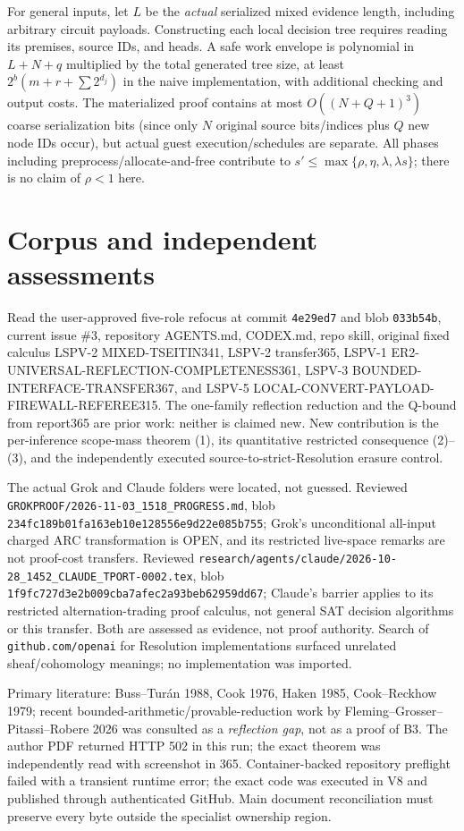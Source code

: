 \documentclass[11pt]{article}
\begin{document}
For general inputs, let $L$ be the \emph{actual} serialized mixed evidence length, including arbitrary circuit payloads. Constructing each local decision tree requires reading its premises, source IDs, and heads. A safe work envelope is polynomial in $L+N+q$ multiplied by the total generated tree size, at least $2^b\left(m+r+\sum 2^{d_j}\right)$ in the naive implementation, with additional checking and output costs. The materialized proof contains at most $O((N+Q+1)^3)$ coarse serialization bits (since only $N$ original source bits/indices plus $Q$ new node IDs occur), but actual guest execution/schedules are separate. All phases including preprocess/allocate-and-free contribute to $s'\le\max\{\rho,\eta,\lambda,\lambda s\}$; there is no claim of $\rho<1$ here.

\section*{Corpus and independent assessments}
Read the user-approved five-role refocus at commit \texttt{4e29ed7} and blob \texttt{033b54b}, current issue \#3, repository AGENTS.md, CODEX.md, repo skill, original fixed calculus LSPV-2 MIXED-TSEITIN341, LSPV-2 transfer365, LSPV-1 ER2-UNIVERSAL-REFLECTION-COMPLETENESS361, LSPV-3 BOUNDED-INTERFACE-TRANSFER367, and LSPV-5 LOCAL-CONVERT-PAYLOAD-FIREWALL-REFEREE315. The one-family reflection reduction and the Q-bound from report365 are prior work: neither is claimed new. New contribution is the per-inference scope-mass theorem (1), its quantitative restricted consequence (2)--(3), and the independently executed source-to-strict-Resolution erasure control.

The actual Grok and Claude folders were located, not guessed. Reviewed \texttt{GROKPROOF/2026-11-03\_1518\_PROGRESS.md}, blob \texttt{234fc189b01fa163eb10e128556e9d22e085b755}; Grok's unconditional all-input charged ARC transformation is OPEN, and its restricted live-space remarks are not proof-cost transfers. Reviewed \texttt{research/agents/claude/2026-10-28\_1452\_CLAUDE\_TPORT-0002.tex}, blob \texttt{1f9fc727d3e2b009cba7afec2a93beb62959dd67}; Claude's barrier applies to its restricted alternation-trading proof calculus, not general SAT decision algorithms or this transfer. Both are assessed as evidence, not proof authority. Search of \texttt{github.com/openai} for Resolution implementations surfaced unrelated sheaf/cohomology meanings; no implementation was imported.

Primary literature: Buss--Tur\'an 1988, Cook 1976, Haken 1985, Cook--Reckhow 1979; recent bounded-arithmetic/provable-reduction work by Fleming--Grosser--Pitassi--Robere 2026 was consulted as a \emph{reflection gap}, not as a proof of B3. The author PDF returned HTTP 502 in this run; the exact theorem was independently read with screenshot in 365. Container-backed repository preflight failed with a transient runtime error; the exact code was executed in V8 and published through authenticated GitHub. Main document reconciliation must preserve every byte outside the specialist ownership region.
\end{document}
